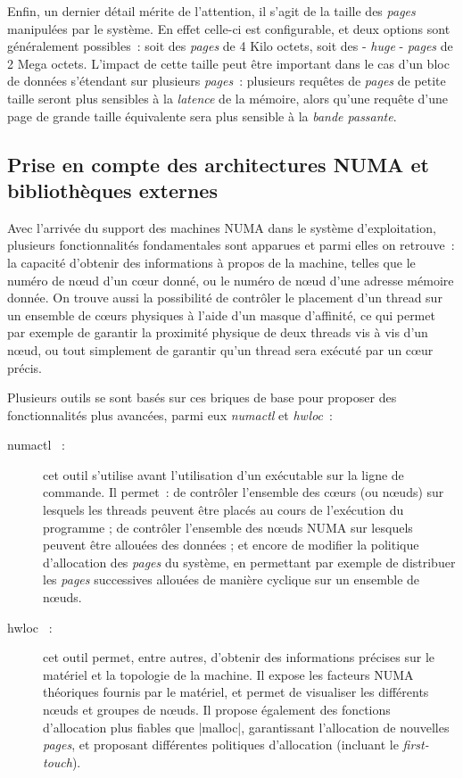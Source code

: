 Enfin, un dernier détail mérite de l'attention, il s'agit de la taille des \emph{pages} manipulées par le système.
En effet celle-ci est configurable, et deux options sont généralement possibles~: soit des \emph{pages} de 4 Kilo octets, soit des - \emph{huge} - \emph{pages} de 2 Mega octets.
L'impact de cette taille peut être important dans le cas d'un bloc de données s'étendant sur plusieurs \emph{pages}~: plusieurs requêtes de \emph{pages} de petite taille seront plus sensibles à la \emph{latence} de la mémoire, alors qu'une requête d'une page de grande taille équivalente sera plus sensible à la \emph{bande passante}.

\subsection{Prise en compte des architectures NUMA et bibliothèques externes}\label{sec:context:os:lib}

Avec l'arrivée du support des machines NUMA dans le système d'exploitation, plusieurs fonctionnalités fondamentales sont apparues et parmi elles on retrouve~: la capacité d'obtenir des informations à propos de la machine, telles que le numéro de nœud d'un cœur donné, ou le numéro de nœud d'une adresse mémoire donnée.
On trouve aussi la possibilité de contrôler le placement d'un thread sur un ensemble de cœurs physiques à l'aide d'un masque d'affinité, ce qui permet par exemple de garantir la proximité physique de deux threads vis à vis d'un nœud, ou tout simplement de garantir qu'un thread sera exécuté par un cœur précis.

Plusieurs outils se sont basés sur ces briques de base pour proposer des fonctionnalités plus avancées, parmi eux \emph{numactl} et \emph{hwloc}~:

\begin{description}
  \item [numactl~\cite{numactl} :] cet outil s'utilise avant l'utilisation d'un exécutable sur la ligne de commande. Il permet~: de contrôler l'ensemble des cœurs (ou nœuds) sur lesquels les threads peuvent être placés au cours de l'exécution du programme ;
    de contrôler l'ensemble des nœuds NUMA sur lesquels peuvent être allouées des données ;
    et encore de modifier la politique d'allocation des \emph{pages} du système, en permettant par exemple de distribuer les \emph{pages} successives allouées de manière cyclique sur un ensemble de nœuds.
  \item [hwloc~\cite{Broquedis2010} :] cet outil permet, entre autres, d'obtenir des informations précises sur le matériel et la topologie de la machine. Il expose les facteurs NUMA théoriques fournis par le matériel, et permet de visualiser les différents nœuds et groupes de nœuds.
  Il propose également des fonctions d'allocation plus fiables que |malloc|, garantissant l'allocation de nouvelles \emph{pages}, et proposant différentes politiques d'allocation (incluant le \emph{first-touch}).
\end{description}


